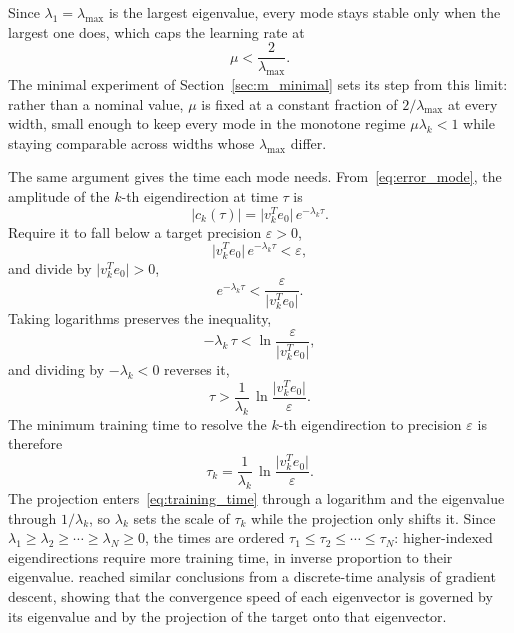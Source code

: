 Since $\lambda_1 = \lambda_{\max}$ is the largest eigenvalue, every mode stays stable only when the largest one does, which caps the learning rate at
\begin{equation*}
    \mu < \frac{2}{\lambda_{\max}}.
\end{equation*}
The minimal experiment of Section~\ref{sec:m_minimal} sets its step from this limit: rather than a nominal value, $\mu$ is fixed at a constant fraction of $2/\lambda_{\max}$ at every width, small enough to keep every mode in the monotone regime $\mu\lambda_k < 1$ while staying comparable across widths whose $\lambda_{\max}$ differ.

The same argument gives the time each mode needs. From~\eqref{eq:error_mode}, the amplitude of the $k$-th eigendirection at time $\tau$ is
\begin{equation*}
    \bigl| c_k(\tau) \bigr| = \bigl| v_k^T e_0 \bigr|\, e^{-\lambda_k\tau}.
\end{equation*}
Require it to fall below a target precision $\varepsilon > 0$,
\[
    \bigl| v_k^T e_0 \bigr|\, e^{-\lambda_k\tau} < \varepsilon,
\]
and divide by $\bigl| v_k^T e_0 \bigr| > 0$,
\[
    e^{-\lambda_k\tau} < \frac{\varepsilon}{\bigl| v_k^T e_0 \bigr|}.
\]
Taking logarithms preserves the inequality,
\[
    -\lambda_k\,\tau < \ln \frac{\varepsilon}{\bigl| v_k^T e_0 \bigr|},
\]
and dividing by $-\lambda_k < 0$ reverses it,
\[
    \tau > \frac{1}{\lambda_k}\,\ln \frac{\bigl| v_k^T e_0 \bigr|}{\varepsilon}.
\]
The minimum training time to resolve the $k$-th eigendirection to precision $\varepsilon$ is therefore
\begin{equation}\label{eq:training_time}
    \tau_k = \frac{1}{\lambda_k}\,\ln \frac{\bigl| v_k^T e_0 \bigr|}{\varepsilon}.
\end{equation}
The projection enters~\eqref{eq:training_time} through a logarithm and the eigenvalue through $1/\lambda_k$, so $\lambda_k$ sets the scale of $\tau_k$ while the projection only shifts it. Since $\lambda_1 \geq \lambda_2 \geq \cdots \geq \lambda_{N} \geq 0$, the times are ordered $\tau_1 \leq \tau_2 \leq \cdots \leq \tau_{N}$: higher-indexed eigendirections require more training time, in inverse proportion to their eigenvalue. \textcite{arora2019} reached similar conclusions from a discrete-time analysis of gradient descent, showing that the convergence speed of each eigenvector is governed by its eigenvalue and by the projection of the target onto that eigenvector.

